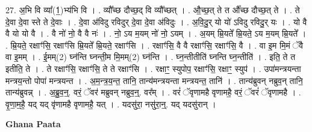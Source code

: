 \documentclass[17pt]{extarticle}
\begin{document}
27. अ॒भि वि व्या᳚(1॒)भ्य॑भि वि । . व्यौ᳚च्छ दौच्छ॒द् वि व्यौ᳚च्छत् । . औ॒च्छ॒त् ते त औ᳚च्छ दौच्छ॒त् ते । . ते दे॒वा दे॒वा स्ते ते दे॒वाः । . दे॒वा अ॑विदु रविदुर् दे॒वा दे॒वा अ॑विदुः । . अ॒वि॒दु॒र् यो यो॑ ऽविदु रविदु॒र् यः । . यो वै वै यो यो वै । . वै नो॑ नो॒ वै वै नः॑ । . नो॒ ऽय म॒यम् नो॑ नो॒ ऽयम् । . अ॒यम् म्रि॒यते᳚ म्रि॒यते॒ ऽय म॒यम् म्रि॒यते᳚ । . म्रि॒यते॒ रक्षाꣳ॑सि॒ रक्षाꣳ॑सि म्रि॒यते᳚ म्रि॒यते॒ रक्षाꣳ॑सि । . रक्षाꣳ॑सि॒ वै वै रक्षाꣳ॑सि॒ रक्षाꣳ॑सि॒ वै । . वा इ॒म मि॒मं ॅवै वा इ॒मम् । . ई॒मम्(2) घ्न॑न्ति घ्नन्ती॒म मि॒मम्(2) घ्न॑न्ति । . घ्न॒न्तीतीति॑ घ्नन्ति घ्न॒न्तीति॑ । . इति॒ ते त इतीति॒ ते । . ते रक्षाꣳ॑सि॒ रक्षाꣳ॑सि॒ ते ते रक्षाꣳ॑सि । . रक्षाꣳ॒॒ स्युपोप॒ रक्षाꣳ॑सि॒ रक्षाꣳ॒॒ स्युप॑ । . उपा॑मन्त्रयन्ता मन्त्रय॒न्तो पोपा॑ मन्त्रयन्त । . अ॒म॒न्त्र॒य॒न्त॒ तानि॒ तान्य॑मन्त्रयन्ता मन्त्रयन्त॒ तानि॑ । . तान्य॑ब्रुवन् नब्रुव॒न् तानि॒ तान्य॑ब्रुवन्न् । . अ॒ब्रु॒व॒न्॒. वरं॒ ॅवर॑ मब्रुवन् नब्रुव॒न्॒. वर᳚म् । . वरं॑ ॅवृणामहै वृणामहै॒ वरं॒ ॅवरं॑ ॅवृणामहै । . वृ॒णा॒म॒है॒ यद् यद् वृ॑णामहै वृणामहै॒ यत् । . यदसु॑रा॒ नसु॑रा॒न्॒. यद् यदसु॑रान् । \newline

\textbf{Ghana Paata } \newline
\end{document}
